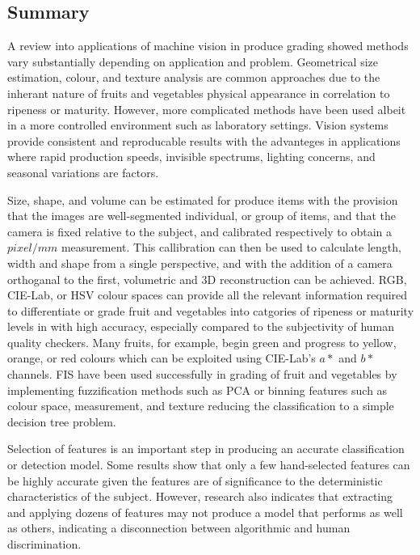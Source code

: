 \documentclass[fleqn,twoside]{article}
\begin{document}
\subsection{Summary}


A review into applications of machine vision in produce grading showed methods vary substantially depending on application and problem. Geometrical size estimation, colour, and texture analysis are common approaches due to the inherant nature of fruits and vegetables physical appearance in correlation to ripeness or maturity. However, more complicated methods have been used albeit in a more controlled environment such as laboratory settings. Vision systems provide consistent and reproducable results with the advanteges in applications where rapid production speeds, invisible spectrums, lighting concerns, and seasonal variations are factors.

Size, shape, and volume can be estimated for produce items with the provision that the images are well-segmented individual, or group of items, and that the camera is fixed relative to the subject, and calibrated respectively to obtain a $pixel/mm$ measurement. This callibration can then be used to calculate length, width and shape from a single perspective, and with the addition of a camera orthoganal to the first, volumetric and 3D reconstruction can be achieved. RGB, CIE-Lab, or HSV colour spaces can provide all the relevant information required to differentiate or grade fruit and vegetables into catgories of ripeness or maturity levels in with high accuracy, especially compared to the subjectivity of human quality checkers. Many fruits, for example, begin green and progress to yellow, orange, or red colours which can be exploited using CIE-Lab's $a*$ and $b*$ channels. FIS have been used successfully in grading of fruit and vegetables by implementing fuzzification methods such as PCA or binning features such as colour space, measurement, and texture reducing the classification to a simple decision tree problem.  

Selection of features is an important step in producing an accurate classification or detection model. Some results show that only a few hand-selected features can be highly accurate given the features are of significance to the deterministic characteristics of the subject. However, research also indicates that extracting and applying dozens of features may not produce a model that performs as well as others, indicating a disconnection between algorithmic and human discrimination.
\end{document}
